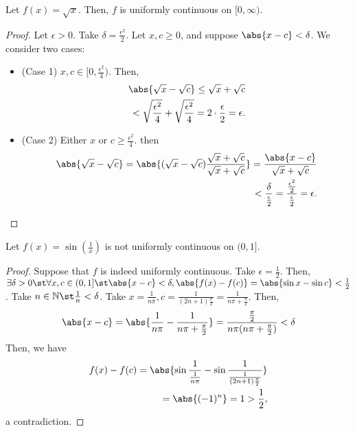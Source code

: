 \documentclass[12pt]{article}
\begin{document}
\begin{example}
  Let $f(x) = \sqrt{x}$. Then, $f$ is uniformly continuous on $[0, \infty)$.
  \begin{proof}
    Let $\epsilon > 0$. Take $\delta = \frac{\epsilon^2}{2}$. Let $x, c \geq 0$, and suppose $\abs{x - c} < \delta$. We consider two cases:
    \begin{itemize}
      \item (Case 1) $x,c \in [0, \frac{\epsilon^2}{4})$. Then, \begin{align*}
        \abs{\sqrt{x} - \sqrt{c}} \leq \sqrt{x} + \sqrt{c}
        \\< \sqrt{\frac{\epsilon^2}{4}} + \sqrt{\frac{\epsilon^2}{4}} = 2\cdot\frac{\epsilon}{2} = \epsilon.
      \end{align*}
      \item (Case 2) Either $x$ or $c \geq \frac{\epsilon^2}{4}$. then \begin{align*}
        \abs{\sqrt{x} - \sqrt{c}} = \abs{(\sqrt{x} - \sqrt{c}) \frac{\sqrt{x} +\sqrt{c}}{\sqrt{x} + \sqrt{c}}} = \frac{\abs{x - c}}{\sqrt{x} + \sqrt{c}}\\
        < \frac{\delta}{\frac{\epsilon}{2}} = \frac{\frac{\epsilon^2}{2}}{\frac{\epsilon}{2}} = \epsilon.
      \end{align*}
    \end{itemize}
  \end{proof}
\end{example}

\begin{example}
  Let $f(x) = \sin (\frac{1}{x})$ is not uniformly continuous on $(0, 1]$.
  \begin{proof}
    Suppose that $f$ is indeed uniformly continuous. Take $\epsilon = \frac{1}{2}$. Then, $\exists \delta > 0 \st \forall x, c \in (0, 1] \st \abs{x - c} < \delta, \abs{f(x) - f(c)} = \abs{\sin x - \sin c} < \frac{1}{2}$. Take $n\in \mathbb{N} \st \frac{1}{n} < \delta$. Take $x = \frac{1}{n \pi}, c = \frac{1}{(2n+1)\frac{\pi}{2}} = \frac{1}{n\pi + \frac{\pi}{2}}$. Then, \begin{align*}
      \abs{x - c} = \abs{\frac{1}{n\pi} - \frac{1}{n\pi + \frac{\pi}{2}}} = \frac{\frac{\pi}{2}}{n \pi (n \pi + \frac{\pi}{2})} < \delta
    \end{align*}
    Then, we have 
    \begin{align*}
      f(x) - f(c) = \abs{\sin \frac{1}{\frac{1}{n\pi}} - \sin \frac{1}{\frac{1}{(2n+1)\frac{\pi}{2}}}}\\
      = \abs{(-1)^n} = 1> \frac{1}{2},
    \end{align*}
    a contradiction.
  \end{proof}
\end{example}
\end{document}
